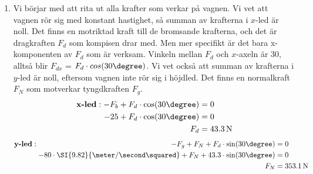 \documentclass[11pt]{article}
\begin{document}
\begin{enumerate}[itemsep=2em]
        \item
              \begin{minipage}[t]{0.6\textwidth}
                      \raggedright
                      Vi börjar med att rita ut alla krafter som verkar på vagnen. Vi vet att vagnen rör sig med konstant hastighet, så summan av krafterna i $x$-led är noll. Det finns en motriktad kraft till de bromsande krafterna, och det är dragkraften $F_d$ som kompisen drar med. Men mer specifikt är det bara x-komponenten av $F_d$ som är verksam. Vinkeln mellan $F_d$ och $x$-axeln är 30\degree{}, alltså blir $F_{dx}$ = $F_d \cdot cos(30\degree)$. Vi vet också att summan av krafterna i $y$-led är noll, eftersom vagnen inte rör sig i höjdled. Det finns en normalkraft $F_{N}$ som motverkar tyngdkraften $F_g$.
                      \begin{align*}
                              \textbf{x-led}: \begin{aligned}[t]
                                                      -F_b + F_d \cdot \cos(30\degree) & = 0                \\
                                                      -25 + F_d \cdot \cos(30\degree)  & = 0                \\
                                                      F_d                              & = 43.3\,\mathrm{N}
                                              \end{aligned}
                      \end{align*}
                      \begin{align*}
                              \textbf{y-led}: \begin{aligned}[t]
                                                      -F_g + F_{N} + F_d \cdot \sin(30\degree)                                         & = 0                 \\
                                                      -80 \cdot \SI{9.82}{\meter/\second\squared} + F_{N} + 43.3 \cdot \sin(30\degree) & = 0                 \\
                                                      F_{N}                                                                            & = 353.1\,\mathrm{N}
                                              \end{aligned}
                      \end{align*}
              \end{minipage}
\end{enumerate}
\end{document}
